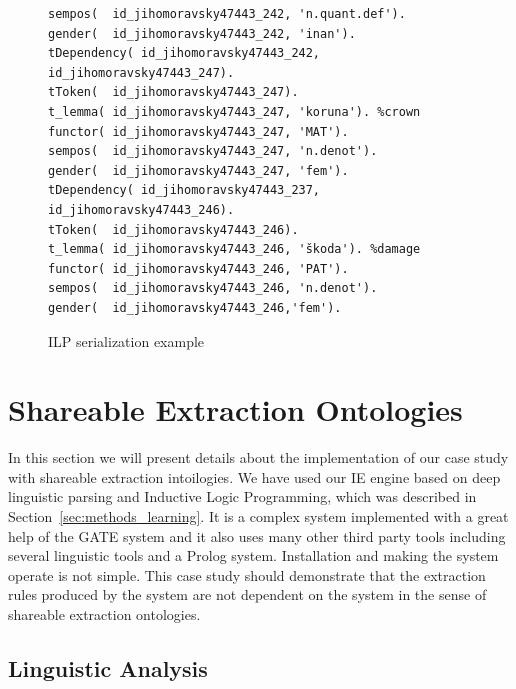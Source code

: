 \begin{figure}
\begin{verbatim}
sempos(  id_jihomoravsky47443_242, 'n.quant.def').
gender(  id_jihomoravsky47443_242, 'inan').
tDependency( id_jihomoravsky47443_242, id_jihomoravsky47443_247).
tToken(  id_jihomoravsky47443_247).
t_lemma( id_jihomoravsky47443_247, 'koruna'). %crown
functor( id_jihomoravsky47443_247, 'MAT').
sempos(  id_jihomoravsky47443_247, 'n.denot').
gender(  id_jihomoravsky47443_247, 'fem').
tDependency( id_jihomoravsky47443_237, id_jihomoravsky47443_246).
tToken(  id_jihomoravsky47443_246).
t_lemma( id_jihomoravsky47443_246, 'škoda'). %damage
functor( id_jihomoravsky47443_246, 'PAT').
sempos(  id_jihomoravsky47443_246, 'n.denot').
gender(  id_jihomoravsky47443_246,'fem').
\end{verbatim}
\caption{ILP serialization example}
\label{lst:ilp_serialization}
\end{figure}









\section{Shareable Extraction Ontologies} \label{sec:implement}
\graphicspath{{../img/ch70/}}


In this section we will present details about the implementation of our case study with shareable extraction intoilogies.  We have used our IE engine based on deep linguistic parsing and Inductive Logic Programming, which was described in Section~\ref{sec:methods_learning}. It is a complex system implemented with a great help of the GATE system and it also uses many other third party tools including several linguistic tools and a Prolog system. Installation and making the system operate is not simple. This case study should demonstrate that the extraction rules produced by the system are not dependent on the system in the sense of shareable extraction ontologies.




\subsection{Linguistic Analysis}


